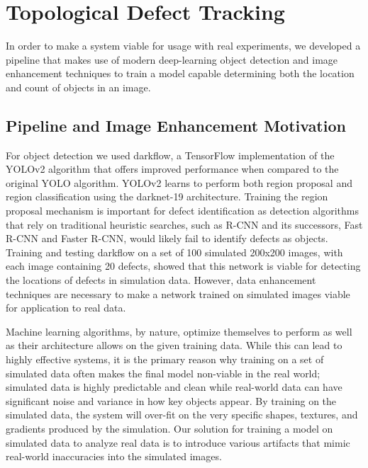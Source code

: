 \documentclass[twoside,twocolumn,9pt]{article}
\begin{document}

\section{Topological Defect Tracking}

In order to make a system viable for usage with real experiments, we developed a pipeline that makes use of modern deep-learning object detection and image enhancement techniques to train a model capable determining both the location and count of objects in an image. 

\subsection{Pipeline and Image Enhancement Motivation}
For object detection we used darkflow\cite{trinh_darkflow_2018}, a TensorFlow implementation of the YOLOv2 algorithm \cite{redmon_yolo9000:_2016} that offers improved performance when compared to the original YOLO algorithm\cite{redmon_you_2015}. YOLOv2 learns to perform both region proposal and region classification using the darknet-19 architecture. Training the region proposal mechanism is important for defect identification as detection algorithms that rely on traditional heuristic searches, such as R-CNN\cite{girshick_rich_2013} and its successors, Fast R-CNN\cite{girshick_fast_2015} and Faster R-CNN\cite{ren_faster_2017}, would likely fail to identify defects as objects. Training and testing darkflow on a set of 100 simulated 200x200 images, with each image containing 20 defects, showed that this network is viable for detecting the locations of defects in simulation data. However, data enhancement techniques are necessary to make a network trained on simulated images viable for application to real data.

Machine learning algorithms, by nature, optimize themselves to perform as well as their architecture allows on the given training data. While this can lead to highly effective systems, it is the primary reason why training on a set of simulated data often makes the final model non-viable in the real world; simulated data is highly predictable and clean while real-world data can have significant noise and variance in how key objects appear. By training on the simulated data, the system will over-fit\cite{lawrence_lessons_1997} \cite{lever_model_2016} on the very specific shapes, textures, and gradients produced by the simulation. %
Our solution for training a model on simulated data to analyze real data is to introduce various artifacts that mimic real-world inaccuracies into the simulated images.
\end{document}
